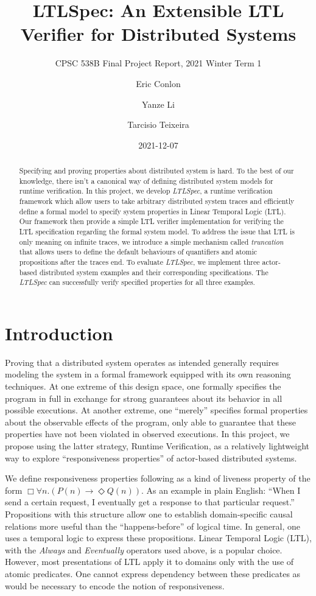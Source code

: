 \documentclass[format=acmsmall, nonacm=true, review=true, screen=true]{acmart}
\title{LTLSpec: An Extensible LTL Verifier for Distributed Systems}
\subtitle{CPSC 538B Final Project Report, 2021 Winter Term 1}
\author{Eric Conlon}
\author{Yanze Li}
\author{Tarcisio Teixeira}
\date{2021-12-07}
\newcommand{\ltlspec}{\textit{LTLSpec}\xspace}
\begin{document}
\begin{abstract}
  Specifying and proving properties about distributed system is hard.
  To the best of our knowledge, there isn't a canonical way of defining distributed system models for runtime verification.
  In this project, we develop \ltlspec, a runtime verification framework which allow users to take arbitrary distributed system traces and efficiently define a formal model to specify system properties in Linear Temporal Logic (LTL).
  Our framework then provide a simple LTL verifier implementation for verifying the LTL specification regarding the formal system model.
  To address the issue that LTL is only meaning on infinite traces, we introduce a simple mechanism called \textit{truncation} that allows users to define the default behaviours of quantifiers and atomic propositions after the traces end.
  To evaluate \ltlspec, we implement three actor-based distributed system examples and their corresponding specifications. The \ltlspec can successfully verify specified properties for all three examples.
\end{abstract}

\maketitle

\section{Introduction}

Proving that a distributed system operates as intended generally requires modeling the system in a formal framework equipped with its own reasoning techniques.
At one extreme of this design space, one formally specifies the program in full in exchange for strong guarantees about its behavior in all possible executions.
At another extreme, one “merely” specifies formal properties about the observable effects of the program, only able to guarantee that these properties have not been violated in observed executions.
In this project, we propose using the latter strategy, Runtime Verification, as a relatively lightweight way to explore “responsiveness properties” of actor-based distributed systems.

We define responsiveness properties following \cite{actorservice,parthasarathy2018modular} as a kind of liveness property of the form \(\Box \forall n. (P(n) \rightarrow \Diamond Q(n))\).
As an example in plain English: “When I send a certain request, I eventually get a response to that particular request.” Propositions with this structure allow one to establish domain-specific causal relations more useful than the “happens-before” of logical time.
In general, one uses a temporal logic to express these propositions. Linear Temporal Logic (LTL), with the \textit{Always} and \textit{Eventually} operators used above, is a popular choice. However, most presentations of LTL apply it to domains only with the use of atomic predicates. One cannot express dependency between these predicates as would be necessary to encode the notion of responsiveness.
\end{document}
